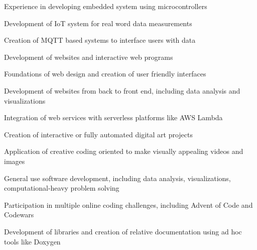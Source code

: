 \documentclass[]{plushcv}
\begin{document}
\begin{minipage}[t]{0.60\textwidth}
  \begin{tightemize}
    \item Experience in developing embedded system using microcontrollers
    \item Development of IoT system for real word data measurements
    \item Creation of MQTT based systems to interface users with data
  \end{tightemize}
  \sectionsep

  \begin{tightemize}
    \item Development of websites and interactive web programs
    \item Foundations of web design and creation of user friendly interfaces
  \end{tightemize}
  \sectionsep

  \begin{tightemize}
    \item Development of websites from back to front end, including data analysis and visualizations
    \item Integration of web services with serverless platforms like AWS Lambda
  \end{tightemize}
  \sectionsep

  \begin{tightemize}
    \item Creation of interactive or fully automated digital art projects
    \item Application of creative coding oriented to make visually appealing videos and images
  \end{tightemize}
  \sectionsep

  \begin{tightemize}
    \item General use software development, including data analysis, visualizations, computational-heavy problem solving
    \item Participation in multiple online coding challenges, including Advent of Code and Codewars
    \item Development of libraries and creation of relative documentation using ad hoc tools like Doxygen
  \end{tightemize}
  \sectionsep


\end{minipage}
\end{document}
